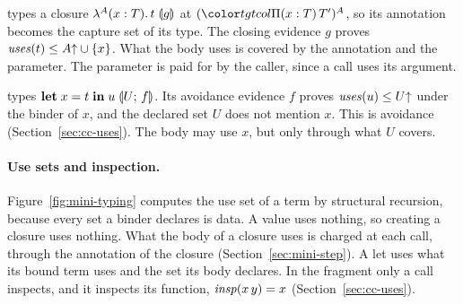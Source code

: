  types a closure $\lambda^{A}(x : T).\,t\;\mathopen{\llparenthesis}g\mathclose{\rrparenthesis}$ at $\capt{(\pit[x]{T}{T'})}{A}$, so its annotation becomes the capture set of its type. The closing evidence $g$ proves $\mathit{uses}(t) \le A{\uparrow} \cup \{x\}$. What the body uses is covered by the annotation and the parameter. The parameter is paid for by the caller, since a call uses its argument.

 types $\mathbf{let}\; x = t \;\mathbf{in}\; u\;\mathopen{\llparenthesis}U;\,f\mathclose{\rrparenthesis}$. Its avoidance evidence $f$ proves $\mathit{uses}(u) \le U{\uparrow}$ under the binder of $x$, and the declared set $U$ does not mention $x$. This is avoidance (Section~\ref{sec:cc-uses}). The body may use $x$, but only through what $U$ covers.

\paragraph{Use sets and inspection.}
Figure~\ref{fig:mini-typing} computes the use set of a term by structural recursion, because every set a binder declares is data. A value uses nothing, so creating a closure uses nothing. What the body of a closure uses is charged at each call, through the annotation of the closure (Section~\ref{sec:mini-step}). A let uses what its bound term uses and the set its body declares. In the fragment only a call inspects, and it inspects its function, $\mathit{insp}(x\,y) = x$ (Section~\ref{sec:cc-uses}).

